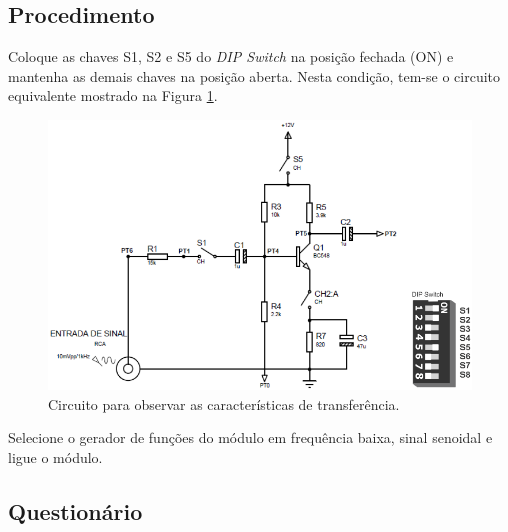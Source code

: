\documentclass[11pt]{article}
\begin{document}
\subsection*{Procedimento}

Coloque as chaves S1, S2 e S5 do \textit{DIP Switch} na posição fechada (ON) e mantenha as demais chaves na posição aberta. Nesta condição, tem-se o circuito equivalente mostrado na Figura \ref{circ2}.

\begin{figure}[!htb]
\centering
\includegraphics[width=.65\textwidth]{AmplificadorEmissorComum.png}
\caption{Circuito para observar as características de transferência.}
\label{circ2}
\end{figure}

Selecione o gerador de funções do módulo em frequência baixa, sinal senoidal e ligue o módulo.

\subsection*{Questionário}
\end{document}
